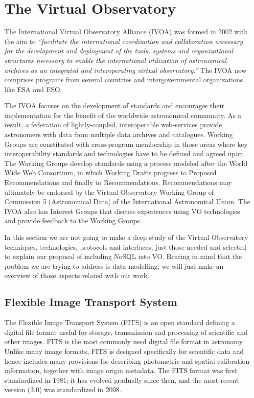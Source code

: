 \chapter{The Virtual Observatory} %
\label{cha:the_virtual_observatory}


The International Virtual Observatory Alliance
(IVOA) was formed in 2002 with the aim to
\emph{``facilitate the international coordination and collaboration necessary for the development and deployment of the tools, systems and organizational structures necessary to enable the international utilization of astronomical archives as an integrated and interoperating virtual observatory.''}
The IVOA now comprises programs from several countries and intergovernmental organizations like ESA and ESO. 

The IVOA focuses on the development of standards and encourages their implementation for the benefit of the worldwide astronomical community.
As a result, a federation of lightly-coupled, interoperable web-services provide astronomers with data from multiple data archives and catalogues.
Working Groups are constituted with cross-program membership in those areas where key interoperability standards and technologies have to be defined and agreed upon. The Working Groups develop standards using a process modeled after the World Wide Web Consortium, in which Working Drafts progress to Proposed Recommendations and finally to Recommendations. Recommendations may ultimately be endorsed by the Virtual Observatory Working Group of Commission 5 (Astronomical Data) of the International Astronomical Union. The IVOA also has Interest Groups that discuss experiences using VO technologies and provide feedback to the Working Groups. 

In this section we are not going to make a deep study of the Virtual Observatory techniques, technologies, protocols and interfaces, just those needed and selected to explain our proposal of including NoSQL into VO. Bearing in mind that the problem we are trying to address is data modelling, we will just make an overview of those aspects related with our work.

\section{Flexible Image Transport System} %
\label{sec:flexible_image_transport_system}


The
Flexible Image Transport System (FITS) is an open standard defining a digital file format useful for storage, transmission and processing of scientific and other images. FITS is the most commonly used digital file format in astronomy. Unlike many image formats, FITS is designed specifically for scientific data and hence includes many provisions for describing photometric and spatial calibration information, together with image origin metadata. The FITS format was first standardized in 1981; it has evolved gradually since then, and the most recent version (3.0) was standardized in 2008. 
  
